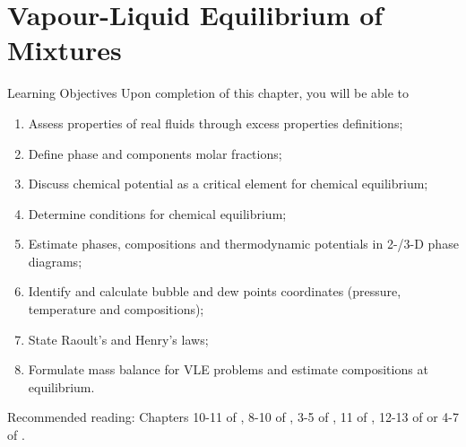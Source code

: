 \chapter{Vapour-Liquid Equilibrium of Mixtures}\label{Chapter:VLE}


   \begin{LearningObjectivesBlock}{Learning Objectives}
      Upon completion of this chapter, you will be able to
        \begin{enumerate}
           \item Assess properties of real fluids through excess properties definitions; 
           \item Define phase and components molar fractions;
           \item Discuss chemical potential as a critical element for chemical equilibrium;
           \item Determine conditions for chemical equilibrium;
           \item Estimate phases, compositions and thermodynamic potentials in 2-/3-D phase diagrams;
           \item Identify and calculate bubble and dew points coordinates (\ie pressure, temperature and compositions);
           \item State Raoult's and Henry's laws;
           \item Formulate mass balance for VLE problems and estimate compositions at equilibrium.
        \end{enumerate}
\medskip
     Recommended reading: Chapters 10-11 of \citet{SmithVanNess_Book}, 8-10 of \cite{Sandler_Book}, 3-5 of \citet{Lue_Book}, 11 of \citet{Moran_Book}, 12-13 of \citet{Devoe_Book} or 4-7 of \citet{Atkins_Book}.
   \end{LearningObjectivesBlock}

